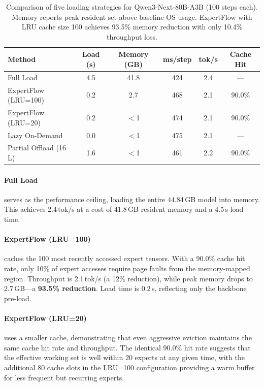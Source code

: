 \documentclass[11pt,a4paper]{article}
\begin{document}
\begin{table}[t]
\centering
\caption{Comparison of five loading strategies for Qwen3-Next-80B-A3B
  (100 steps each). Memory reports peak resident set above baseline OS usage.
  ExpertFlow with LRU cache size 100 achieves 93.5\% memory reduction with
  only 10.4\% throughput loss.}
\label{tab:loading-methods}
\begin{tabular}{lccccc}
\toprule
\textbf{Method} & \textbf{Load (s)} & \textbf{Memory (GB)} &
  \textbf{ms/step} & \textbf{tok/s} & \textbf{Cache Hit} \\
\midrule
Full Load               & 4.5 & 41.8  & 424 & 2.4 & ---   \\
ExpertFlow (LRU=100)    & 0.2 &  2.7  & 468 & 2.1 & 90.0\% \\
ExpertFlow (LRU=20)     & 0.2 & $<$1  & 474 & 2.1 & 90.0\% \\
Lazy On-Demand          & 0.0 & $<$1  & 475 & 2.1 & ---   \\
Partial Offload (16\,L) & 1.6 & $<$1  & 461 & 2.2 & 90.0\% \\
\bottomrule
\end{tabular}
\end{table}

\paragraph{Full Load} serves as the performance ceiling, loading the entire
44.84\,GB model into memory. This achieves 2.4\,tok/s at a cost of 41.8\,GB
resident memory and a 4.5\,s load time.

\paragraph{ExpertFlow (LRU=100)} caches the 100 most recently accessed expert
tensors. With a 90.0\% cache hit rate, only 10\% of expert accesses require
page faults from the memory-mapped region. Throughput is 2.1\,tok/s (a 12\%
reduction), while peak memory drops to 2.7\,GB---a \textbf{93.5\% reduction}.
Load time is 0.2\,s, reflecting only the backbone pre-load.

\paragraph{ExpertFlow (LRU=20)} uses a smaller cache, demonstrating that even
aggressive eviction maintains the same cache hit rate and throughput. The
identical 90.0\% hit rate suggests that the effective working set is well
within 20 experts at any given time, with the additional 80 cache slots in the
LRU=100 configuration providing a warm buffer for less frequent but recurring
experts.
\end{document}
